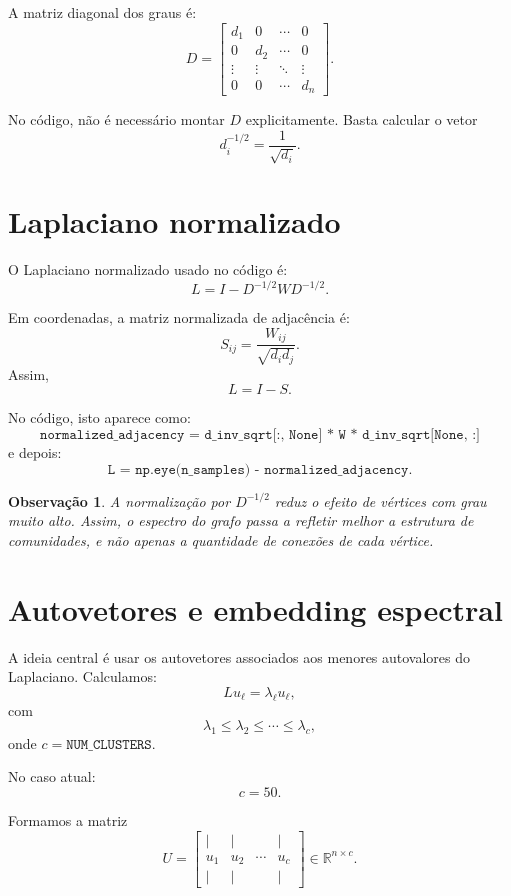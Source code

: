 \documentclass[11pt,a4paper]{article}
\newtheorem{remark}{Observação}
\begin{document}
A matriz diagonal dos graus é:
\[
D =
\begin{bmatrix}
d_1 & 0 & \cdots & 0\\
0 & d_2 & \cdots & 0\\
\vdots & \vdots & \ddots & \vdots\\
0 & 0 & \cdots & d_n
\end{bmatrix}.
\]

No código, não é necessário montar \(D\) explicitamente. Basta calcular o vetor
\[
d^{-1/2}_i = \frac{1}{\sqrt{d_i}}.
\]

\section{Laplaciano normalizado}

O Laplaciano normalizado usado no código é:
\[
L = I - D^{-1/2}WD^{-1/2}.
\]

Em coordenadas, a matriz normalizada de adjacência é:
\[
S_{ij} = \frac{W_{ij}}{\sqrt{d_i d_j}}.
\]
Assim,
\[
L = I - S.
\]

No código, isto aparece como:
\[
\texttt{normalized\_adjacency = d\_inv\_sqrt[:, None] * W * d\_inv\_sqrt[None, :]}
\]
e depois:
\[
\texttt{L = np.eye(n\_samples) - normalized\_adjacency}.
\]

\begin{remark}
A normalização por \(D^{-1/2}\) reduz o efeito de vértices com grau muito alto.
Assim, o espectro do grafo passa a refletir melhor a estrutura de comunidades,
e não apenas a quantidade de conexões de cada vértice.
\end{remark}

\section{Autovetores e embedding espectral}

A ideia central é usar os autovetores associados aos menores autovalores do
Laplaciano. Calculamos:
\[
L u_\ell = \lambda_\ell u_\ell,
\]
com
\[
\lambda_1 \leq \lambda_2 \leq \cdots \leq \lambda_c,
\]
onde \(c=\texttt{NUM\_CLUSTERS}\).

No caso atual:
\[
c=50.
\]

Formamos a matriz
\[
U =
\begin{bmatrix}
| & | & & |\\
u_1 & u_2 & \cdots & u_c\\
| & | & & |
\end{bmatrix}
\in \mathbb{R}^{n\times c}.
\]
\end{document}
